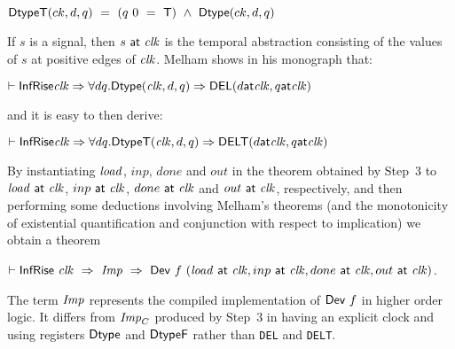 \documentclass{llncs}
\begin{document}
$\mathsf{DtypeT}(ck,d,q) ~ = ~ (q~0~ =~\mathsf{T})~\wedge~\mathsf{Dtype}(ck,d,q)$

\vspace*{1mm}

If $s$ is a signal, then $s~\mathsf{at}~\mathit{clk}$ is the temporal
abstraction consisting of the values of $s$ at positive edges of
$\mathit{clk}$. 
Melham shows in his monograph that:

\vspace*{-1mm}


{\baselineskip14pt\begin{alltt}
\( \vdash \DEF{InfRise} \VAR{clk} \Rightarrow {\forall}d q. \DEF{Dtype}(\VAR{clk},d,q) \Rightarrow \DEF{DEL}(d \DEF{at} \VAR{clk}, q \DEF{at} \VAR{clk}) \)
\end{alltt}}

\vspace*{-1mm}

\noindent and it is easy to then derive:

\vspace*{-1mm}

{\baselineskip14pt\begin{alltt}
\( \vdash \DEF{InfRise} \VAR{clk} \Rightarrow {\forall}d q. \DEF{DtypeT}(\VAR{clk},d,q) \Rightarrow \DEF{DELT}(d \DEF{at} \VAR{clk}, q \DEF{at} \VAR{clk})  \)
\end{alltt}}

\vspace*{-1mm}

By instantiating $\mathit{load}$, $inp$, $done$ and $out$ in the theorem
obtained by Step~3 to $\mathit{load}~\mathsf{at}~\mathit{clk}$, $inp~\mathsf{at}~\mathit{clk}$,
$done~\mathsf{at}~\mathit{clk}$ and $out~\mathsf{at}~\mathit{clk}$, respectively, and then
performing some deductions involving Melham's theorems (and the
monotonicity of existential quantification and conjunction with
respect to implication) we obtain a theorem

\vspace*{1mm}

$\vdash \mathsf{InfRise}~\mathit{clk}~\Rightarrow~{\it{Imp}}~\Rightarrow~\mathsf{Dev}~f~(\mathit{load}~\mathsf{at}~\mathit{clk},inp~\mathsf{at}~\mathit{clk},done~\mathsf{at}~\mathit{clk},out~\mathsf{at}~\mathit{clk})$.

\vspace*{1mm}

The term ${\it{Imp}}$ represents the compiled implementation of $\mathsf{Dev}~f$ in higher order logic.
It differs from ${\it{Imp}}_C$ produced by Step~3 in having an explicit clock and using
registers $\mathsf{Dtype}$ and $\mathsf{DtypeF}$ rather than \texttt{DEL} and \texttt{DELT}.
\end{document}
